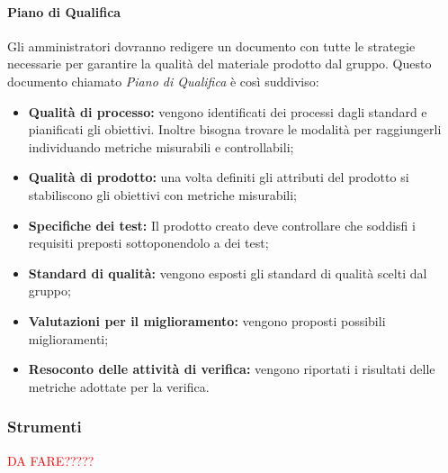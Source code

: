 \paragraph{Piano di Qualifica} Gli amministratori dovranno redigere un documento con tutte le strategie necessarie per garantire la qualità del materiale prodotto dal gruppo. Questo documento chiamato \textit{Piano di Qualifica} è così suddiviso:
\begin{itemize}
    \item \textbf{Qualità di processo:} vengono identificati dei processi dagli standard e pianificati gli obiettivi. Inoltre bisogna trovare le modalità per raggiungerli individuando metriche misurabili e controllabili;
    
    \item \textbf{Qualità di prodotto:} una volta definiti gli attributi del prodotto si stabiliscono gli obiettivi con metriche misurabili;
    
    \item \textbf{Specifiche dei test:} Il prodotto creato deve controllare che soddisfi i requisiti preposti sottoponendolo a dei test;
    
    \item \textbf{Standard di qualità:} vengono esposti gli standard di qualità scelti dal gruppo;
    
    \item \textbf{Valutazioni per il miglioramento:} vengono proposti possibili miglioramenti;
    
    \item \textbf{Resoconto delle attività di verifica:} vengono riportati i risultati delle metriche adottate per la verifica.
\end{itemize}

\subsubsection{Strumenti}
\textcolor{red}{DA FARE?????}
